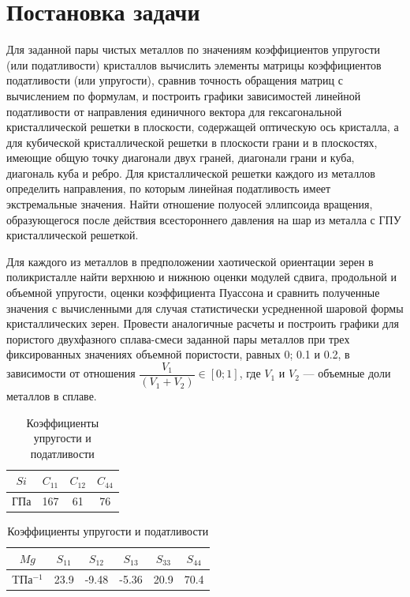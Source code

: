 \documentclass[12pt, a4paper]{article}
\begin{document}
\newpage

\section{Постановка задачи}

Для заданной пары чистых металлов по значениям коэффициентов упругости
(или податливости) кристаллов вычислить элементы матрицы коэффициентов податливости (или упругости), сравнив точность обращения матриц с вычислением по
формулам, и построить графики зависимостей линейной податливости от направления единичного вектора для гексагональной кристаллической решетки в плоскости,
содержащей оптическую ось кристалла, а для кубической кристаллической решетки в плоскости грани и в плоскостях, 
имеющие общую точку диагонали двух граней,
 диагонали грани и куба, диагональ куба и ребро. Для
кристаллической решетки каждого из металлов определить направления, по которым линейная податливость имеет экстремальные значения. Найти отношение полуосей эллипсоида вращения, образующегося после действия всестороннего давления
на шар из металла с ГПУ кристаллической решеткой.

Для каждого из металлов в предположении хаотической ориентации зерен в поликристалле найти верхнюю и нижнюю оценки модулей сдвига, продольной и объемной
упругости, оценки коэффициента Пуассона и сравнить полученные значения с вычисленными для случая статистически усредненной шаровой формы кристаллических
зерен. Провести аналогичные расчеты и построить графики для пористого двухфазного сплава-смеси заданной пары металлов при трех фиксированных значениях объемной пористости, равных 0; 0.1 и 0.2, в зависимости от отношения $\dfrac{V_1}{(V_1+V_2)}\in [0;1]$, где $V_1$ и $V_2$ --- объемные доли металлов в сплаве.

\begin{table}[htb!]
	\centering	
	\caption{Коэффициенты упругости и податливости}
	\vspace*{3mm}
	\begin{tabular}{|c|c|c|c|}
		\hline
		$Si$ & $C_{11}$ & $C_{12}$ & $C_{44}$ \\
		\hline
		ГПа & 167 & 61 & 76 \\
		\hline
	\end{tabular}
	\qquad
	\begin{tabular}{|c|c|c|c|c|c|}
		\hline
		$Mg$ & $S_{11}$ & $S_{12}$ & $S_{13}$ & $S_{33}$ & $S_{44}$ \\
		\hline
		TПа$^{-1}$ & 23.9 & -9.48 & -5.36 & 20.9 & 70.4 \\
		\hline
	\end{tabular}
	\label{tab1}
\end{table}
\end{document}
